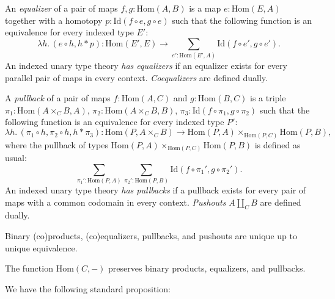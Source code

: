 \documentclass[reqno]{amsart}
\theoremstyle{definition}
\theoremstyle{remark}
\newcommand{\fs}[1]{\mathrm{#1}}
\newcommand{\Hom}{\fs{Hom}}
\newcommand{\Id}{\fs{Id}}
\numberwithin{figure}{section}
\begin{document}
An \emph{equalizer} of a pair of maps $f,g : \Hom(A,B)$ is a map $e : \Hom(E,A)$ together with a homotopy $p : \Id(f \circ e, g \circ e)$
such that the following function is an equivalence for every indexed type $E'$:
\[ \lambda h.\,(e \circ h, h * p) : \Hom(E', E) \to \sum_{e' : \Hom(E',A)} \Id(f \circ e', g \circ e'). \]
An indexed unary type theory \emph{has equalizers} if an equalizer exists for every parallel pair of maps in every context.
\emph{Coequalizers} are defined dually.

A \emph{pullback} of a pair of maps $f : \Hom(A,C)$ and $g : \Hom(B,C)$ is a triple $\pi_1 : \Hom(A \times_C B, A)$, $\pi_2 : \Hom(A \times_C B, B)$, $\pi_3 : \Id(f \circ \pi_1, g \circ \pi_2)$
such that the following function is an equivalence for every indexed type $P'$:
\[ \lambda h.\,(\pi_1 \circ h, \pi_2 \circ h, h * \pi_3) : \Hom(P, A \times_C B) \to \Hom(P,A) \times_{\Hom(P,C)} \Hom(P,B), \]
where the pullback of types $\Hom(P,A) \times_{\Hom(P,C)} \Hom(P,B)$ is defined as usual:
\[ \sum_{\pi_1' : \Hom(P,A)} \sum_{\pi_2' : \Hom(P,B)} \Id(f \circ \pi_1', g \circ \pi_2'). \]
An indexed unary type theory \emph{has pullbacks} if a pullback exists for every pair of maps with a common codomain in every context.
\emph{Pushouts} $A \amalg_C B$ are defined dually.

\begin{remark}
Binary (co)products, (co)equalizers, pullbacks, and pushouts are unique up to unique equivalence.
\end{remark}

\begin{remark}
The function $\Hom(C,-)$ preserves binary products, equalizers, and pullbacks.
\end{remark}

We have the following standard proposition:
\end{document}
